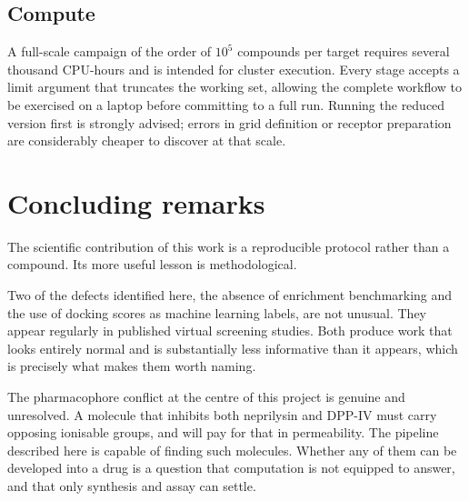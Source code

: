 \documentclass[11pt,a4paper]{article}
\begin{document}
\subsection{Compute}

A full-scale campaign of the order of $10^5$ compounds per target requires
several thousand CPU-hours and is intended for cluster execution. Every stage
accepts a limit argument that truncates the working set, allowing the complete
workflow to be exercised on a laptop before committing to a full run. Running
the reduced version first is strongly advised; errors in grid definition or
receptor preparation are considerably cheaper to discover at that scale.

\section{Concluding remarks}

The scientific contribution of this work is a reproducible protocol rather than
a compound. Its more useful lesson is methodological.

Two of the defects identified here, the absence of enrichment benchmarking and
the use of docking scores as machine learning labels, are not unusual. They
appear regularly in published virtual screening studies. Both produce work that
looks entirely normal and is substantially less informative than it appears,
which is precisely what makes them worth naming.

The pharmacophore conflict at the centre of this project is genuine and
unresolved. A molecule that inhibits both neprilysin and DPP-IV must carry
opposing ionisable groups, and will pay for that in permeability. The pipeline
described here is capable of finding such molecules. Whether any of them can be
developed into a drug is a question that computation is not equipped to answer,
and that only synthesis and assay can settle.
\end{document}
